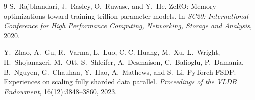\documentclass[11pt]{article}
\theoremstyle{definition}
\theoremstyle{plain}
\begin{document}
\newpage
\begin{thebibliography}{9}
  S.~Rajbhandari, J.~Rasley, O.~Ruwase, and Y.~He.
  \newblock ZeRO: Memory optimizations toward training trillion parameter
  models.
  \newblock In \emph{SC20: International Conference for High Performance
  Computing, Networking, Storage and Analysis}, 2020.

  Y.~Zhao, A.~Gu, R.~Varma, L.~Luo, C.-C. Huang, M.~Xu, L.~Wright,
  H.~Shojanazeri, M.~Ott, S.~Shleifer, A.~Desmaison, C.~Balioglu,
  P.~Damania, B.~Nguyen, G.~Chauhan, Y.~Hao, A.~Mathews, and S.~Li.
  \newblock PyTorch FSDP: Experiences on scaling fully sharded data
  parallel.
  \newblock \emph{Proceedings of the VLDB Endowment}, 16(12):3848--3860,
  2023.
\end{thebibliography}
\end{document}
